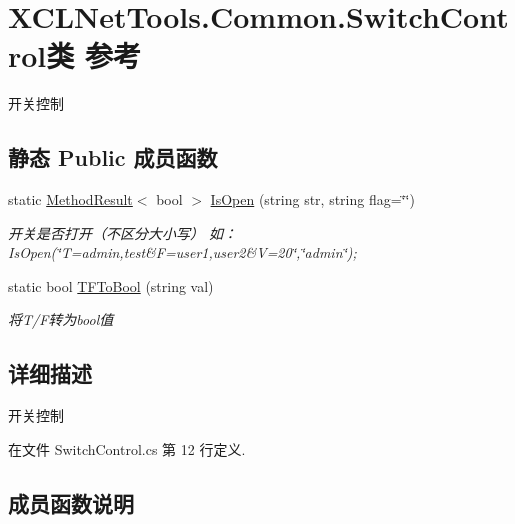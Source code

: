 \hypertarget{class_x_c_l_net_tools_1_1_common_1_1_switch_control}{}\section{X\+C\+L\+Net\+Tools.\+Common.\+Switch\+Control类 参考}
\label{class_x_c_l_net_tools_1_1_common_1_1_switch_control}


开关控制  


\subsection*{静态 Public 成员函数}
\begin{DoxyCompactItemize}
\item 
static \hyperlink{class_x_c_l_net_tools_1_1_entity_1_1_method_result}{Method\+Result}$<$ bool $>$ \hyperlink{class_x_c_l_net_tools_1_1_common_1_1_switch_control_a810d2339e8bc7bbf4990e1701cfd2513}{Is\+Open} (string str, string flag=\char`\"{}\char`\"{})
\begin{DoxyCompactList}\small\item\em 开关是否打开（不区分大小写） 如：\+Is\+Open(\char`\"{}\+T=admin,test\&\+F=user1,user2\&\+V=20\char`\"{},\char`\"{}admin\char`\"{}); \end{DoxyCompactList}\item 
static bool \hyperlink{class_x_c_l_net_tools_1_1_common_1_1_switch_control_a12aeb06896faa380374bffdc5e648d31}{T\+F\+To\+Bool} (string val)
\begin{DoxyCompactList}\small\item\em 将\+T/\+F转为bool值 \end{DoxyCompactList}\end{DoxyCompactItemize}


\subsection{详细描述}
开关控制 



在文件 Switch\+Control.\+cs 第 12 行定义.



\subsection{成员函数说明}
\mbox{\label{class_x_c_l_net_tools_1_1_common_1_1_switch_control_a810d2339e8bc7bbf4990e1701cfd2513}} 
